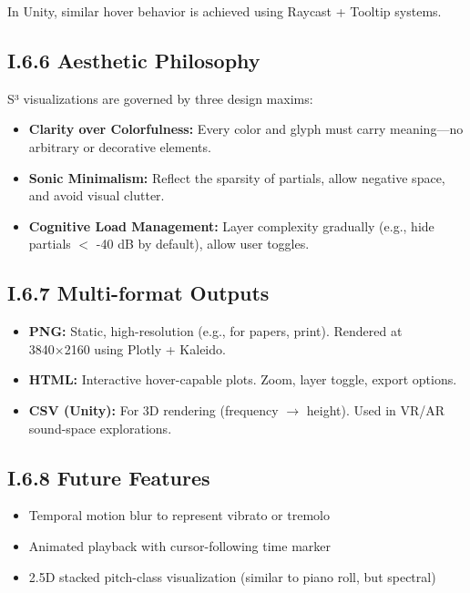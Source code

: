 In Unity, similar hover behavior is achieved using Raycast + Tooltip systems.

\subsection*{I.6.6 Aesthetic Philosophy}

S³ visualizations are governed by three design maxims:

\begin{itemize}
    \item \textbf{Clarity over Colorfulness:} Every color and glyph must carry meaning—no arbitrary or decorative elements.
    \item \textbf{Sonic Minimalism:} Reflect the sparsity of partials, allow negative space, and avoid visual clutter.
    \item \textbf{Cognitive Load Management:} Layer complexity gradually (e.g., hide partials $<$ -40 dB by default), allow user toggles.
\end{itemize}

\subsection*{I.6.7 Multi-format Outputs}

\begin{itemize}
    \item \textbf{PNG:} Static, high-resolution (e.g., for papers, print). Rendered at 3840×2160 using Plotly + Kaleido.
    \item \textbf{HTML:} Interactive hover-capable plots. Zoom, layer toggle, export options.
    \item \textbf{CSV (Unity):} For 3D rendering (frequency $\rightarrow$ height). Used in VR/AR sound-space explorations.
\end{itemize}

\subsection*{I.6.8 Future Features}

\begin{itemize}
    \item Temporal motion blur to represent vibrato or tremolo
    \item Animated playback with cursor-following time marker
    \item 2.5D stacked pitch-class visualization (similar to piano roll, but spectral)
\end{itemize}

